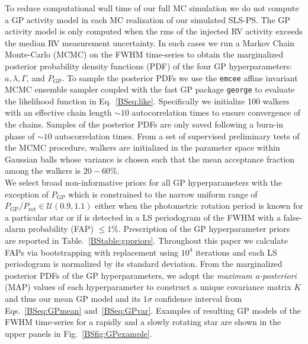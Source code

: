 To reduce computational wall time of our full MC simulation
we do not compute a GP activity model in each MC realization of our simulated
SLS-PS. The GP activity model is only computed when the rms of the injected RV activity exceeds the median RV measurement
uncertainty. In such cases we run a Markov Chain Monte-Carlo
(MCMC) on the FWHM time-series to obtain the marginalized posterior probability density functions (PDF)
of the four GP hyperparameters: $a,\lambda,\Gamma$, and $P_{\text{GP}}$.
To sample the posterior PDFs we use the \texttt{emcee} affine invariant
MCMC ensemble sampler \citep{foremanmackey13} coupled with the fast GP package \texttt{george} 
\citep{ambikasaran15} to evaluate the likelihood function in Eq.~\ref{BSeq:like}.
Specifically we initialize 100 walkers with an effective chain length
$\sim 10$ autocorrelation times to ensure convergence of the chains.
Samples of the posterior PDFs are only saved following a burn-in phase of $\sim 10$ autocorrelation times.
From a set of supervised preliminary tests of the MCMC procedure, walkers are initialized in the
parameter space within Gaussian balls whose variance is chosen such that the mean acceptance fraction among
the walkers is $20-60$\%. \\

We select broad non-informative priors for all GP hyperparameters with the
exception of $P_{\text{GP}}$ which is constrained to the narrow uniform range of
$P_{\text{GP}}/P_{\text{rot}} \in \mathcal{U}(0.9,1.1)$ either when the photometric rotation period is known for a
particular star or if \prot{} is detected in a LS periodogram
of the FWHM with a false-alarm probability (FAP) $\le 1$\%. Prescription of the GP hyperparameter priors are
reported in Table.~\ref{BStable:gppriors}. Throughout this paper we calculate FAPs via
bootstrapping with replacement using $10^4$ iterations and each LS periodogram is normalized by its standard
deviation. From the marginalized posterior PDFs of the GP hyperparameters, we adopt the \emph{maximum a-posteriori}
(MAP) values of each hyperparameter to construct a unique covariance matrix $K$ and thus our mean GP model
and its $1\sigma$ confidence interval from Eqs.~\ref{BSeq:GPmean} and~\ref{BSeq:GPvar}. Examples of resulting
GP models of the FWHM time-series for a rapidly and a slowly rotating star are shown in the upper panels in
Fig.~\ref{BSfig:GPexample}. \\





